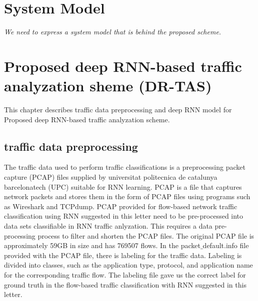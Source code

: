 \documentclass[10pt, twoside, jounal]{IEEEtran}
\begin{document}
\section{System Model}
{\it We need to express a system model that is behind the proposed scheme.}


\section{Proposed deep RNN-based traffic analyzation sheme (DR-TAS)}
This chapter describes traffic data preprocessing and deep RNN model for Proposed deep RNN-based traffic analyzation scheme.

\subsection{traffic data preprocessing}
The traffic data used to perform traffic classifications is a preprocessing packet capture (PCAP) files supplied by universitat politecnica de catalunya barcelonatech (UPC) \cite{Valentin2014} suitable for RNN learning.
PCAP is a file that captures network packets and stores them in the form of PCAP files using programs such as Wireshark and TCPdump.
PCAP provided for flow-based network traffic classification using RNN suggested in this letter need to be pre-processed into data sets classifiable in RNN traffic anlyzation. This requires a data pre-processing process to filter and shorten the PCAP files.
The original PCAP file is approximately 59GB in size and has 769507 flows.
In the packet$\_$default.info file provided with the PCAP file, there is labeling for the traffic data.
Labeling is divided into classes, such as the application type, protocol, and application name for the corresponding traffic flow.
The labeling file gave us the correct label for ground truth in the flow-based traffic classification with RNN suggested in this letter.
\end{document}
